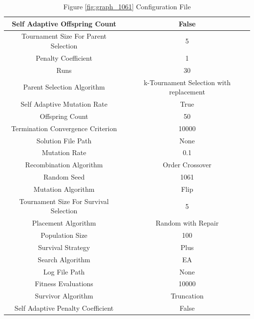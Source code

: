 \documentclass{standalone}
\begin{document}
\clearpage
\begin{table}[!htb]
	\centering
	\caption{Figure \ref{fig:graph_1061} Configuration File}
	\label{tab:graph_1061}
	\begin{tabular}{| c | c |}
		\hline
		Self Adaptive Offspring Count		& False		 \\
		\hline
		Tournament Size For Parent Selection		& 5		 \\
		\hline
		Penalty Coefficient		& 1		 \\
		\hline
		Runs		& 30		 \\
		\hline
		Parent Selection Algorithm		& k-Tournament Selection with replacement		 \\
		\hline
		Self Adaptive Mutation Rate		& True		 \\
		\hline
		Offspring Count		& 50		 \\
		\hline
		Termination Convergence Criterion		& 10000		 \\
		\hline
		Solution File Path		& None		 \\
		\hline
		Mutation Rate		& 0.1		 \\
		\hline
		Recombination Algorithm		& Order Crossover		 \\
		\hline
		Random Seed		& 1061		 \\
		\hline
		Mutation Algorithm		& Flip		 \\
		\hline
		Tournament Size For Survival Selection		& 5		 \\
		\hline
		Placement Algorithm		& Random with Repair		 \\
		\hline
		Population Size		& 100		 \\
		\hline
		Survival Strategy		& Plus		 \\
		\hline
		Search Algorithm		& EA		 \\
		\hline
		Log File Path		& None		 \\
		\hline
		Fitness Evaluations		& 10000		 \\
		\hline
		Survivor Algorithm		& Truncation		 \\
		\hline
		Self Adaptive Penalty Coefficient		& False		 \\
		\hline
	\end{tabular}
\end{table}
\end{document}
